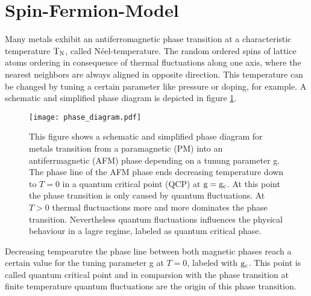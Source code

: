 \section{Spin-Fermion-Model}
\label{sec:spin-fermion-model}
%
%
Many metals exhibit an antiferromagnetic phase transition at a characteristic temperature $\mathrm{T}_{\mathrm{N}}$, called N\'eel-temperature.
The random ordered spins of lattice atoms ordering in consequence of thermal fluctuations along one axis, where the nearest neighbors are always aligned in opposite direction.
This temperature can be changed by tuning a certain parameter like pressure or doping, for example.
A schematic and simplified phase diagram is depicted in figure \ref{fig:phase diagram}.
%
\begin{figure}[t]
	\centering
	\texttt{[image: phase\_diagram.pdf]}
	\caption{
This figure shows a schematic and simplified phase diagram for metals transition from a paramagnetic (PM) into an antiferrmagnetic (AFM) phase depending on a tunung parameter g.
The phase line of the AFM phase ends decreasing temperature down to $T = 0$ in a quantum critical point (QCP) at $\mathrm{g} = \mathrm{g}_{\mathrm{c}}$.
At this point the phase transition is only caused by quantum fluctuations.
At $T > 0$ thermal fluctuactions more and more dominates the phase transition.
Nevertheless quantum fluctuations influences the physical behaviour in a lagre regime, labeled as quantum critical phase.
	}
	\label{fig:phase diagram}
\end{figure}
%
Decreasing tempearutre the phase line between both magnetic phases reach a certain value for the tuning parameter g at $T = 0$, labeled with $\mathrm{g}_{\mathrm{c}}$.
This point is called quantum critical point and in comparsion with the phase transition at finite temperature quantum fluctuations are the origin of this phase transition.

